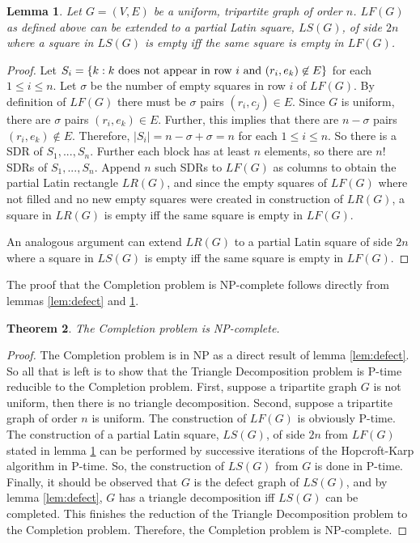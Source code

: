 \documentclass[12pt]{article}
\newtheorem{theorem}{Theorem}[section]
\newtheorem{lemma}[theorem]{Lemma}
\theoremstyle{definition}
\theoremstyle{remark}
\begin{document}
\begin{lemma}
	\label{lem:construction}
	Let $G=(V, E)$ be a uniform, tripartite graph of order $n$. $LF(G)$ as defined above can be extended to a partial Latin square, $LS(G)$, of side $2n$ where a square in $LS(G)$ is empty iff the same square is empty in $LF(G)$.
\end{lemma}

\begin{proof}
	Let $S_i = \{ k : k \textnormal{ does not appear in row } i \textnormal{ and } (r_i, e_k) \not\in E \}$ for each $1 \leq i \leq n$. Let $\sigma$ be the number of empty squares in row $i$ of $LF(G)$. By definition of $LF(G)$ there must be $\sigma$ pairs $(r_i, c_j) \in E$. Since $G$ is uniform, there are $\sigma$ pairs $(r_i, e_k) \in E$. Further, this implies that there are $n-\sigma$ pairs $(r_i, e_k) \not\in E$. Therefore, $|S_i|=n-\sigma+\sigma=n$ for each $1 \leq i \leq n$. So there is a SDR of $S_1, ..., S_n$. Further each block has at least $n$ elements, so there are $n!$ SDRs of $S_1, ..., S_n$. Append $n$ such SDRs to $LF(G)$ as columns to obtain the partial Latin rectangle $LR(G)$, and since the empty squares of $LF(G)$ where not filled and no new empty squares were created in construction of $LR(G)$, a square in $LR(G)$ is empty iff the same square is empty in $LF(G)$.
	
	An analogous argument can extend $LR(G)$ to a partial Latin square of side $2n$ where a square in $LS(G)$ is empty iff the same square is empty in $LF(G)$.
\end{proof}

The proof that the Completion problem is NP-complete follows directly from lemmas \ref{lem:defect} and \ref{lem:construction}.

\begin{theorem}
	The Completion problem is NP-complete.
\end{theorem}

\begin{proof}
	The Completion problem is in NP as a direct result of lemma \ref{lem:defect}. So all that is left is to show that the Triangle Decomposition problem is P-time reducible to the Completion problem. First, suppose a tripartite graph $G$ is not uniform, then there is no triangle decomposition. Second, suppose a tripartite graph of order $n$ is uniform. The construction of $LF(G)$ is obviously P-time. The construction of a partial Latin square, $LS(G)$, of side $2n$ from $LF(G)$ stated in lemma \ref{lem:construction} can be performed by successive iterations of the Hopcroft-Karp\cite{hopcroft-karp} algorithm in P-time. So, the construction of $LS(G)$ from $G$ is done in P-time. Finally, it should be observed that $G$ is the defect graph of $LS(G)$, and by lemma \ref{lem:defect}, $G$ has a triangle decomposition iff $LS(G)$ can be completed. This finishes the reduction of the Triangle Decomposition problem to the Completion problem. Therefore, the Completion problem is NP-complete.
\end{proof}



\end{document}
